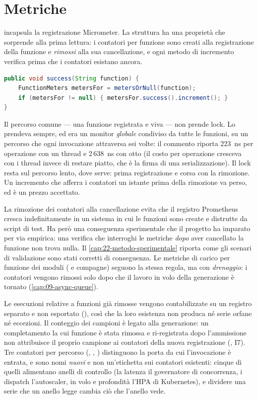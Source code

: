\section{Metriche}

 incapsula la registrazione Micrometer. La struttura ha una
propriet\`a che sorprende alla prima lettura: i contatori per funzione sono
creati alla registrazione della funzione e \emph{rimossi} alla sua
cancellazione, e ogni metodo di incremento verifica prima che i contatori
esistano ancora.

\begin{lstlisting}[language=Java]
public void success(String function) {
    FunctionMeters metersFor = metersOrNull(function);
    if (metersFor != null) { metersFor.success().increment(); }
}
\end{lstlisting}

Il percorso comune --- una funzione registrata e viva --- non prende lock. Lo
prendeva sempre, ed era un monitor \emph{globale} condiviso da tutte le
funzioni, su un percorso che ogni invocazione attraversa sei volte: il
commento riporta 223~ns per operazione con un thread e 2\,638~ns con otto (il
costo per operazione cresceva con i thread invece di restare piatto, che \`e la
firma di una serializzazione). Il lock resta sul percorso lento, dove serve:
prima registrazione e corsa con la rimozione. Un incremento che afferra i
contatori un istante prima della rimozione va perso, ed \`e un prezzo accettato.

La rimozione dei contatori alla cancellazione evita che il registro Prometheus
cresca indefinitamente in un sistema in cui le funzioni sono create e distrutte da
script di test. Ha per\`o una conseguenza sperimentale che il progetto ha
imparato per via empirica: una verifica che interroghi le metriche \emph{dopo}
aver cancellato la funzione non trova nulla. Il \cref{cap:22-metodo-sperimentale}
riporta come gli scenari di validazione sono stati corretti di conseguenza.
Le metriche di carico per funzione dei moduli ( e
compagne) seguono la stessa regola, ma con \emph{drenaggio}: i contatori vengono
rimossi solo dopo che il lavoro in volo della generazione \`e tornato
(\cref{cap:09-async-queue}).

Le esecuzioni relative a funzioni gi\`a rimosse vengono contabilizzate su un
registro separato e non esportato (), cos\`i che la
loro esistenza non produca n\'e serie orfane n\'e eccezioni. Il conteggio dei
campioni \`e legato alla generazione: un completamento la cui funzione \`e stata
rimossa e ri-registrata dopo l'ammissione non attribuisce il proprio campione ai
contatori della nuova registrazione (, I7).
Tre contatori per percorso (, , )
distinguono la porta da cui l'invocazione \`e entrata, e sono nomi \emph{nuovi} e non
un'etichetta sui contatori esistenti: cinque di quelli alimentano anelli di
controllo (la latenza il governatore di concorrenza, i dispatch l'autoscaler, in
volo e profondit\`a l'HPA di Kubernetes), e dividere una serie che un anello legge
cambia ci\`o che l'anello vede.
